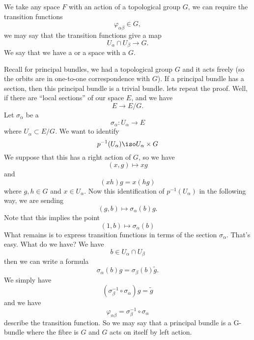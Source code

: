 We take any space $F$ with an action of a topological group $G$,
we can require the transition functions
\begin{equation}
\varphi_{\alpha\beta}\in G,
\end{equation}
we may say that the transition functions give a map
\begin{equation}
U_{\alpha}\cap U_{\beta}\to G.
\end{equation}
We say that we have a  or a space with a
 $G$.

Recall for principal bundles, we had a topological group $G$ and
it acts freely (so the orbits are in one-to-one correspondence
with $G$). If a principal bundle has a section, then this
principal bundle is a trivial bundle. lets repeat the
proof. Well, if there are ``local sections'' of our space $E$,
and we have
\begin{equation}
E\to E/G.
\end{equation}
Let $\sigma_{\alpha}$ be a 
\begin{equation}
\sigma_{\alpha}\colon U_{\alpha}\to E
\end{equation}
where $U_{\alpha}\subset E/G$. We want to identify
\begin{equation}
p^{-1}(U_{\alpha})\iso U_{\alpha}\times G
\end{equation}
We suppose that this has a right action of $G$, so we have
\begin{equation}
(x,g)\mapsto xg
\end{equation}
and
\begin{equation}
(xh)g=x(hg)
\end{equation}
where $g,h\in G$ and $x\in U_{\alpha}$. Now this identification
of $p^{-1}(U_{\alpha})$ in the following way, we are sending
\begin{equation}
(g,b)\mapsto\sigma_{\alpha}(b)g.
\end{equation}
Note that this implies the point
\begin{equation}
(1,b)\mapsto\sigma_{\alpha}(b)
\end{equation}
What remains is to express transition functions in terms of the
section $\sigma_{\alpha}$. That's easy. What do we have? We have
\begin{equation}
b\in U_{\alpha}\cap U_{\beta}
\end{equation}
then we can write a formula
\begin{equation}
\sigma_{\alpha}(b)g=\sigma_{\beta}(b)\widetilde{g}.
\end{equation}
We simply have
\begin{equation}
(\sigma_{\beta}^{-1}\circ\sigma_{\alpha})g=\widetilde{g}
\end{equation}
and we have
\begin{equation}
\varphi_{\alpha\beta}=\sigma_{\beta}^{-1}\circ\sigma_{\alpha}
\end{equation}
describe the transition function. So we may say that a principal
bundle is a G-bundle where the fibre is $G$ and $G$ acts on
itself by left action.

